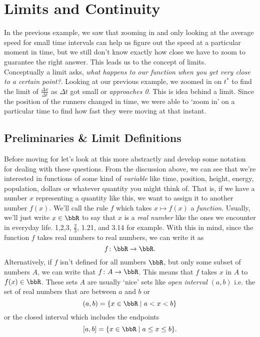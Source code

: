 \section{Limits and Continuity}


In the previous example, we saw that zooming in and only looking at the average speed for small time intervals can help us figure out the speed at a particular moment in time, but we still don't know exactly how close we have to zoom to guarantee the right answer. This leads us to the concept of limits.\\

Conceptually a limit asks, \emph{what happens to our function when you get very close to a certain point?}. Looking at our previous example, we zoomed in on $t^*$ to find the limit of $\frac{\Delta x}{\Delta t}$ as $\Delta t$ got small or \emph{approaches 0}. This is idea behind a limit. Since the position of the runners changed in time, we were able to `zoom in' on a particular time to find how fast they were moving at that instant.

\subsection{Preliminaries \& Limit Definitions}

Before moving for let's look at this more abstractly and develop some notation for dealing with these questions. From the discussion above, we can see that we're interested in functions of some kind of \emph{variable} like time, position, height, energy, population, dollars or whatever quantity you might think of. That is, if we have a number $x$ representing a quantity like this, we want to assign it to another number $f(x)$.  We'll call the rule $f$ which takes $x\mapsto f(x)$ a \emph{function}. Usually, we'll just write $x\in\bbR$ to say that $x$ is a \emph{real number} like the ones we encounter in everyday life. 1,2,3, $\frac{2}{3}$, 1.21, and 3.14 for example. With this in mind, since the function $f$ takes real numbers to real numbers, we can write it as
\[
f\colon \bbR \to \bbR.
\] Alternatively, if $f$ isn't defined for all numbers $\bbR$, but only some subset of numbers $A$, we can write that $f\colon A\to\bbR$. This means that $f$ takes $x$ in $A$ to $f(x)\in\bbR$. These sets $A$ are usually `nice' sets like \emph{open interval} $(a,b)$ i.e. the set of real numbers that are between $a$ and $b$ or
\[
(a,b)=\{x\in\bbR \mid a<x<b \}
\]
or the closed interval which includes the endpoints
\[
[a,b]=\{x\in\bbR \mid a\leq x\leq b \}.
\]

